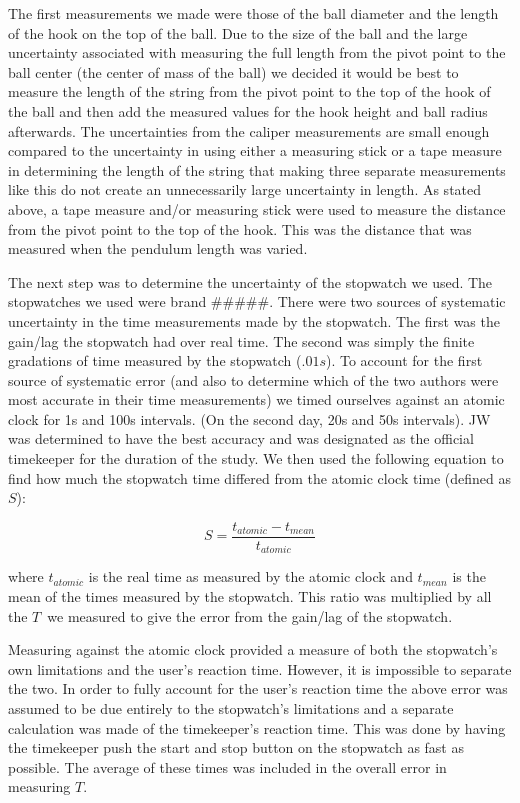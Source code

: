 \documentclass[iop,numberedappendix,appendixfloats]{emulateapj}
\def\T{$T$}
\begin{document}
The first measurements we made were those of the ball diameter and the length 
of the hook on the top of the ball.  Due to the size of 
the ball and the large uncertainty associated with measuring the full length 
from the pivot point to the ball center (the center of mass of the
ball) we decided it would be best to measure the length of the string from the
pivot point to the top of the hook of the ball and then add the measured values 
for the hook height and ball radius afterwards.  The uncertainties from the 
caliper measurements are small enough compared to the uncertainty in using 
either a measuring stick or a tape measure in determining the length of the
string that making three separate measurements like this do not create an 
unnecessarily large uncertainty in length.  As stated above, a tape measure 
and/or measuring stick were used to measure the distance from the pivot point
to the top of the hook.  This was the distance that was measured when the
pendulum length was varied.

The next step was to determine the uncertainty of the stopwatch we used.  The
stopwatches we used were brand \#\#\#\#\#.  There were two sources of systematic 
uncertainty in the time measurements made by the stopwatch.  The first was the 
gain/lag the stopwatch had over real time.  The second was simply the finite 
gradations of time measured by the stopwatch ($.01 s$).  To account for the 
first source of systematic error (and also to determine which of the two 
authors were most accurate in their time measurements) we timed 
ourselves against an atomic clock for 1s and 100s intervals.  (On the second
day, 20s and 50s intervals). JW 
was determined to have the best accuracy and was 
designated as the official timekeeper for the duration of the study.  
We then used the following equation to find how much the stopwatch time
differed from the atomic clock time (defined as $S$):

\begin{equation}
\label{eq:S}
S=\frac{t_{atomic}-t_{mean}}{t_{atomic}} 
\end{equation}

where $t_{atomic}$ is the real time as measured by the 
atomic clock 
and $t_{mean}$ is the mean of the times measured by the 
stopwatch.  This ratio was multiplied by all the \T\ we measured to give
the error from the gain/lag of the stopwatch.

Measuring against the atomic clock provided a measure of both the stopwatch's 
own limitations and the user's reaction time.  However, it is impossible to 
separate the two.  In order to fully account for the user's reaction time the 
above error was assumed to be due entirely to the stopwatch's limitations and 
a separate calculation was made of the timekeeper's reaction time.  This was 
done by having the timekeeper push the start and stop button on the 
stopwatch as fast as possible.  The average of these times was included in 
the overall error in measuring \T.
\end{document}
